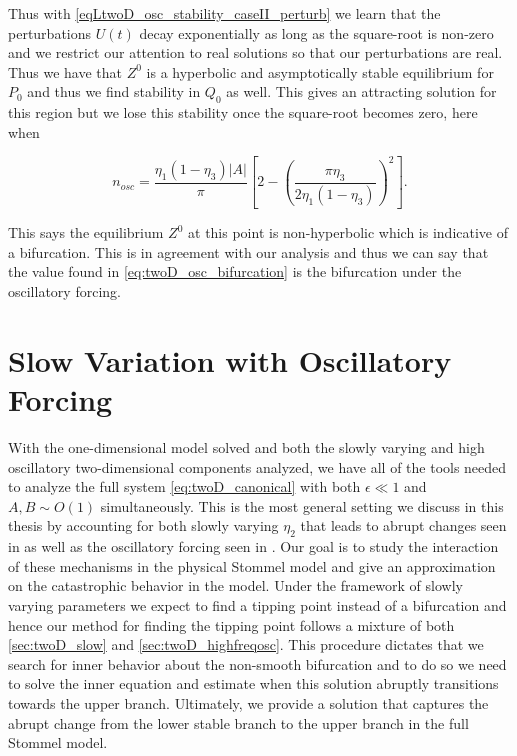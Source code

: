 Thus with \eqref{eqLtwoD_osc_stability_caseII_perturb} we learn that the perturbations $U(t)$ decay exponentially as long as the square-root is non-zero and we restrict our attention to real solutions so that our perturbations are real. Thus we have that $Z^0$ is a hyperbolic and asymptotically stable equilibrium for $P_0$ and thus we find stability in $Q_0$ as well. This gives an attracting solution for this region but we lose this stability once the square-root becomes zero, here when

\begin{equation*}
n_{osc} = \frac{\eta_1(1-\eta_3)|A|}{\pi}\left[2-\left(\frac{\pi\eta_3}{2\eta_1(1-\eta_3)}\right)^2\right].
\end{equation*}

This says the equilibrium $Z^0$ at this point is non-hyperbolic which is indicative of a bifurcation. This is in agreement with our analysis and thus we can say that the value found in \eqref{eq:twoD_osc_bifurcation} is the bifurcation under the oscillatory forcing.


\section{Slow Variation with Oscillatory Forcing}
\label{sec:twoD_slowosc}

With the one-dimensional model solved and both the slowly varying and high oscillatory two-dimensional components analyzed, we have all of the tools needed to analyze the full system \eqref{eq:twoD_canonical} with both $\epsilon \ll 1$ and $A,B\sim O(1)$ simultaneously. This is the most general setting we discuss in this thesis by accounting for both slowly varying $\eta_2$ that leads to abrupt changes seen in \cite{alley2003abrupt,marotzke2000abrupt,rahmstorf2000thermohaline} as well as the oscillatory forcing seen in \cite{roberts2017relaxation,huybers2005obliquity}. Our goal is to study the interaction of these mechanisms in the physical Stommel model and give an approximation on the catastrophic behavior in the model. Under the framework of slowly varying parameters we expect to find a tipping point instead of a bifurcation and hence our method for finding the tipping point follows a mixture of both \autoref{sec:twoD_slow} and \autoref{sec:twoD_highfreqosc}. This procedure dictates that we search for inner behavior about the non-smooth bifurcation and to do so we need to solve the inner equation and estimate when this solution abruptly transitions towards the upper branch. Ultimately, we provide a solution that captures the abrupt change from the lower stable branch to the upper branch in the full Stommel model.

